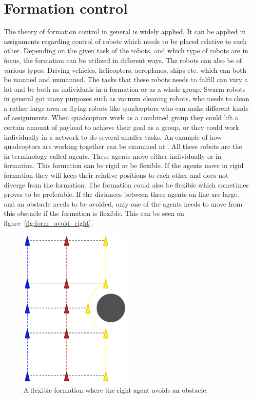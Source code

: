 \section{Formation control}

The theory of formation control in general is widely applied. It can be applied in assignments regarding control of robots which needs to be placed relative to each other. Depending on the given task of the robots, and which type of robots are in focus, the formation can be utilized in different ways. The robots can also be of various types: Driving vehicles, helicopters, aeroplanes, ships etc. which can both be manned and unmanned. The tasks that these robots needs to fulfill can vary a lot and be both as individuals in a formation or as a whole group. Swarm robots in general got many purposes such as vacuum cleaning robots, who needs to clean a rather large area or flying robots like quadcoptors who can make different kinds of assignments. When quadcoptors work as a combined group they could lift a certain amount of payload to achieve their goal as a group, or they could work individually in a network to do several smaller tasks. An example of how quadcoptors are working together can be examined at \citep{ethswarm}. All these robots are the in terminology called agents. These agents move either individually or in formation. This formation can be rigid or be flexible. If the agents move in rigid formation they will keep their relative positions to each other and does not diverge from the formation. The formation could also be flexible which sometimes proves to be preferable. If the distances between three agents on line are large, and an obstacle needs to be avoided, only one of the agents needs to move from this obstacle if the formation is flexible. This can be seen on figure~\vref{fig:form_avoid_right}.
\begin{figure}[htbp]
	\centering
	\includegraphics[width=0.5\textwidth]{fig/form_avoid_right}
	\caption{A flexible formation where the right agent avoids an obstacle.}
	\label{fig:form_avoid_right}
\end{figure}

